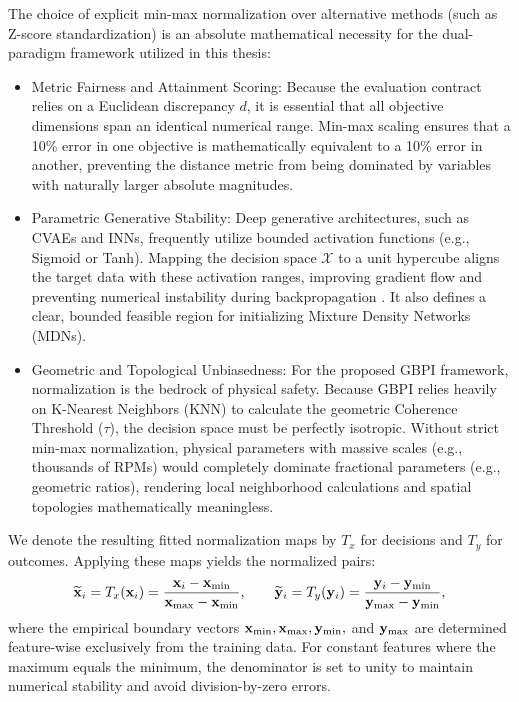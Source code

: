 The choice of explicit min-max normalization over alternative methods (such as Z-score standardization) is an absolute mathematical necessity for the dual-paradigm framework utilized in this thesis:

\begin{itemize}
    \item Metric Fairness and Attainment Scoring: Because the evaluation contract relies on a Euclidean discrepancy $d$, it is essential that all objective dimensions span an identical numerical range. Min-max scaling ensures that a 10\% error in one objective is mathematically equivalent to a 10\% error in another, preventing the distance metric from being dominated by variables with naturally larger absolute magnitudes.
    \item Parametric Generative Stability: Deep generative architectures, such as CVAEs and INNs, frequently utilize bounded activation functions (e.g., Sigmoid or Tanh). Mapping the decision space $\mathcal{X}$ to a unit hypercube aligns the target data with these activation ranges, improving gradient flow and preventing numerical instability during backpropagation \cite{Sola1997, Sarle1997}. It also defines a clear, bounded feasible region for initializing Mixture Density Networks (MDNs).
    \item Geometric and Topological Unbiasedness: For the proposed GBPI framework, normalization is the bedrock of physical safety. Because GBPI relies heavily on K-Nearest Neighbors (KNN) to calculate the geometric Coherence Threshold ($\tau$), the decision space must be perfectly isotropic. Without strict min-max normalization, physical parameters with massive scales (e.g., thousands of RPMs) would completely dominate fractional parameters (e.g., geometric ratios), rendering local neighborhood calculations and spatial topologies mathematically meaningless.
\end{itemize}

We denote the resulting fitted normalization maps by $T_x$ for decisions and $T_y$ for outcomes. Applying these maps yields the normalized pairs:
\begin{equation}
  \widetilde{\mathbf{x}}_i = T_x(\mathbf{x}_i) = \frac{\mathbf{x}_i - \mathbf{x}_{\min}}{\mathbf{x}_{\max} - \mathbf{x}_{\min}},
  \qquad 
  \widetilde{\mathbf{y}}_i = T_y(\mathbf{y}_i) = \frac{\mathbf{y}_i - \mathbf{y}_{\min}}{\mathbf{y}_{\max} - \mathbf{y}_{\min}},
  \label{eq:normalization_maps}
\end{equation}
where the empirical boundary vectors $\mathbf{x}_{\min}, \mathbf{x}_{\max}, \mathbf{y}_{\min},$ and $\mathbf{y}_{\max}$ are determined feature-wise exclusively from the training data. For constant features where the maximum equals the minimum, the denominator is set to unity to maintain numerical stability and avoid division-by-zero errors. 

